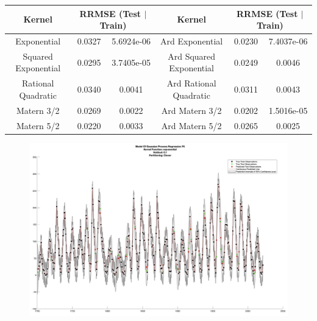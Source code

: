 \documentclass[12pt,a4paper]{article}
\begin{document}
\noindent
\footnotesize{
\begin{center}
\begin{tabular}{ |c|c|c || c|c|c|  }
 \hline
 \textbf{Kernel} & \multicolumn{2}{|c||}{\textbf{RRMSE (Test $\mid$ Train)}} & \textbf{Kernel} & \multicolumn{2}{|c|}{\textbf{RRMSE (Test $\mid$ Train)}}\\
 \hline
  \hline
 Exponential & 0.0327 & 5.6924e-06 & Ard Exponential & 0.0230 & 7.4037e-06\\
  \hline
 Squared Exponential & 0.0295 & 3.7405e-05 & Ard Squared Exponential & 0.0249 & 0.0046\\
  \hline
 Rational Quadratic & 0.0340 & 0.0041 & Ard Rational Quadratic & 0.0311 & 0.0043\\
  \hline
 Matern 3/2 & 0.0269 & 0.0022 & Ard Matern 3/2 & 0.0202 & 1.5016e-05\\
  \hline
 Matern 5/2 & 0.0220 & 0.0033 & Ard Matern 5/2 & 0.0265 & 0.0025\\
 \hline
\end{tabular}
\end{center}
}

\newpage

\begin{figure}[H]
	\centering
	\includegraphics[scale = 0.2]{Exponential.jpg}
\end{figure}

\vspace{3cm}
\end{document}
